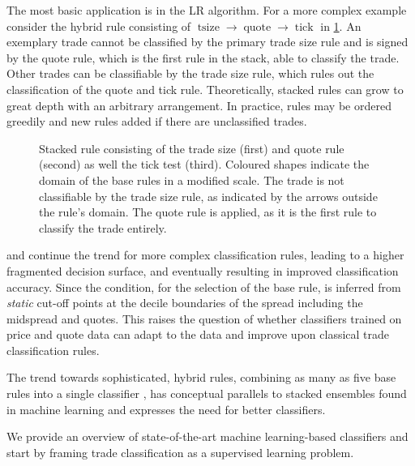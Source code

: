 The most basic application is in the \gls{LR} algorithm. For a more complex example consider the hybrid rule consisting of $\operatorname{tsize} \to \operatorname{quote} \to \operatorname{tick}$ in \cref{fig:stacking-algo}. An exemplary trade cannot be classified by the primary trade size rule and is signed by the quote rule, which is the first rule in the stack, able to classify the trade. Other trades can be classifiable by the trade size rule, which rules out the classification of the quote and tick rule. Theoretically, stacked rules can grow to great depth with an arbitrary arrangement. In practice, rules may be ordered greedily and new rules added if there are unclassified trades.

\begin{figure}[ht!]
    \centering
    
    \caption[Stacked Trade Classification Rules]{Stacked rule consisting of the trade size (first) and quote rule (second) as well the tick test (third). Coloured shapes indicate the domain of the base rules in a modified scale. The trade is not classifiable by the trade size rule, as indicated by the arrows outside the rule's domain. The quote rule is applied, as it is the first rule to classify the trade entirely.}
    \label{fig:stacking-algo}
\end{figure}

\textcite[][3811]{chakrabartyTradeClassificationAlgorithms2007} and \textcite[][18]{grauerOptionTradeClassification2022} continue the trend for more complex classification rules, leading to a higher fragmented decision surface, and eventually resulting in improved classification accuracy. Since the condition, for the selection of the base rule, is inferred from \emph{static} cut-off points at the decile boundaries of the spread including the midspread and quotes. This raises the question of whether classifiers trained on price and quote data can adapt to the data and improve upon classical trade classification rules.

The trend towards sophisticated, hybrid rules, combining as many as five base rules into a single classifier \autocite[cp.][18]{grauerOptionTradeClassification2022}, has conceptual parallels to stacked ensembles found in machine learning and expresses the need for better classifiers.

We provide an overview of state-of-the-art machine learning-based classifiers and start by framing trade classification as a supervised learning
problem.

